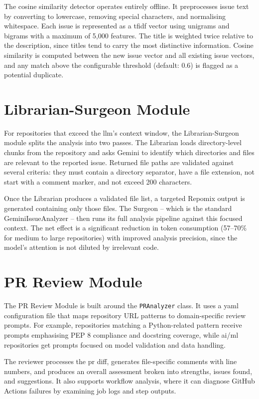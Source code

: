 The cosine similarity detector operates entirely offline. It preprocesses issue text by converting to lowercase, removing special characters, and normalising whitespace. Each issue is represented as a \gls{tfidf} vector using unigrams and bigrams with a maximum of 5,000 features. The title is weighted twice relative to the description, since titles tend to carry the most distinctive information. Cosine similarity is computed between the new issue vector and all existing issue vectors, and any match above the configurable threshold (default: 0.6) is flagged as a potential duplicate.

\section{Librarian-Surgeon Module}

For repositories that exceed the \gls{llm}'s context window, the Librarian-Surgeon module splits the analysis into two passes. The Librarian loads directory-level chunks from the repository and asks Gemini to identify which directories and files are relevant to the reported issue. Returned file paths are validated against several criteria: they must contain a directory separator, have a file extension, not start with a comment marker, and not exceed 200 characters.

Once the Librarian produces a validated file list, a targeted Repomix output is generated containing only those files. The Surgeon -- which is the standard GeminiIssueAnalyzer -- then runs its full analysis pipeline against this focused context. The net effect is a significant reduction in token consumption (57--70\% for medium to large repositories) with improved analysis precision, since the model's attention is not diluted by irrelevant code.

\section{PR Review Module}

The PR Review Module is built around the \texttt{PRAnalyzer} class. It uses a \gls{yaml} configuration file that maps repository URL patterns to domain-specific review prompts. For example, repositories matching a Python-related pattern receive prompts emphasising PEP 8 compliance and docstring coverage, while \gls{ai}/\gls{ml} repositories get prompts focused on model validation and data handling.

The reviewer processes the \gls{pr} diff, generates file-specific comments with line numbers, and produces an overall assessment broken into strengths, issues found, and suggestions. It also supports workflow analysis, where it can diagnose GitHub Actions failures by examining job logs and step outputs.

